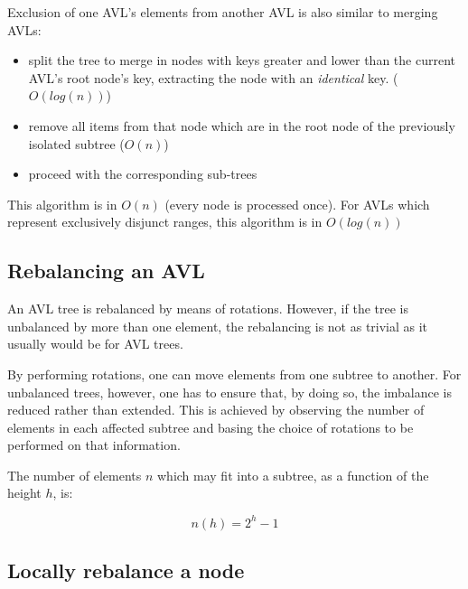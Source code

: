         Exclusion of one AVL's elements from another AVL is also similar to
        merging AVLs:

        \begin{itemize}
            \item split the tree to merge in nodes with keys greater and lower
                than the current AVL's root node's key, extracting the node
                with an \emph{identical} key. ($O(log(n))$)
            \item remove all items from that node which are in the root node
                of the previously isolated subtree ($O(n)$)
            \item proceed with the corresponding sub-trees
        \end{itemize}

        This algorithm is in $O(n)$ (every node is processed once).
        For AVLs which represent exclusively disjunct ranges, this algorithm
        is in $O(log(n))$


    \subsection{Rebalancing an AVL}
    \label{sec:AVL_ops-rebalance}

        An AVL tree is rebalanced by means of rotations.
        However, if the tree is unbalanced by more than one element, the
        rebalancing is not as trivial as it usually would be for AVL trees.

        By performing rotations, one can move elements from one subtree to
        another.
        For unbalanced trees, however, one has to ensure that, by doing so, the
        imbalance is reduced rather than extended.
        This is achieved by observing the number of elements in each affected
        subtree and basing the choice of rotations to be performed on that
        information.

        The number of elements $n$ which may fit into a subtree, as a function
        of the height $h$, is:

        \begin{equation}
            n(h) = 2^h-1
        \end{equation}

    \subsection{Locally rebalance a node}
    \label{sec:AVL_ops-locally-rebalance}

